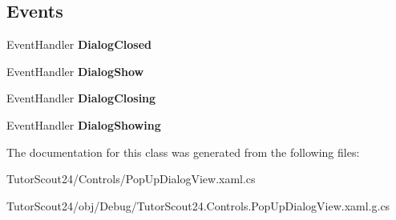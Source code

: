 \subsection*{Events}
\begin{DoxyCompactItemize}
\item 
\mbox{\label{class_tutor_scout24_1_1_controls_1_1_pop_up_dialog_view_ac6fb1529eac0121702def1d3bc0f87a9}} 
Event\+Handler {\bfseries Dialog\+Closed}
\item 
\mbox{\label{class_tutor_scout24_1_1_controls_1_1_pop_up_dialog_view_a016361e212ffd56cd9090bd3b2bb7e80}} 
Event\+Handler {\bfseries Dialog\+Show}
\item 
\mbox{\label{class_tutor_scout24_1_1_controls_1_1_pop_up_dialog_view_a8040eb0e26d7b109baf343236ae330d3}} 
Event\+Handler {\bfseries Dialog\+Closing}
\item 
\mbox{\label{class_tutor_scout24_1_1_controls_1_1_pop_up_dialog_view_a0372ef72824516a30be59030887df144}} 
Event\+Handler {\bfseries Dialog\+Showing}
\end{DoxyCompactItemize}


The documentation for this class was generated from the following files\+:\begin{DoxyCompactItemize}
\item 
Tutor\+Scout24/\+Controls/Pop\+Up\+Dialog\+View.\+xaml.\+cs\item 
Tutor\+Scout24/obj/\+Debug/Tutor\+Scout24.\+Controls.\+Pop\+Up\+Dialog\+View.\+xaml.\+g.\+cs\end{DoxyCompactItemize}
